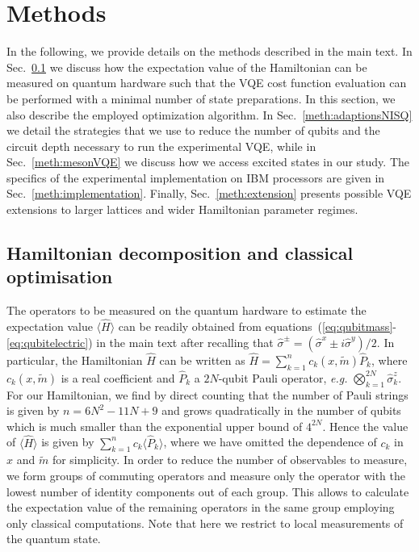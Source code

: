 \documentclass[twocolumn,aps,showpacs,prb,superscriptaddress,floatfix,10pt,nofootinbib]{revtex4-2}
\begin{document}
\section*{Methods}
In the following, we provide details on the methods described in the main text. In Sec.~\ref{meth:classicalPart} we discuss how the expectation value of the Hamiltonian can be measured on quantum hardware such that the VQE cost function evaluation can be performed with a minimal number of state preparations. In this section, we also describe the employed optimization algorithm. In Sec.~\ref{meth:adaptionsNISQ} we detail the strategies that we use to reduce the number of qubits and the circuit depth necessary to run the experimental VQE, while in Sec.~\ref{meth:mesonVQE} we discuss how we access excited states in our study. The specifics of the experimental implementation on IBM processors are given in Sec.~\ref{meth:implementation}. Finally, Sec.~\ref{meth:extension} presents possible VQE extensions to larger lattices and wider Hamiltonian parameter regimes.



\subsection{Hamiltonian decomposition and classical optimisation}
\label{meth:classicalPart}
The operators to be measured on the quantum hardware to estimate the expectation value $\langle \hat{H} \rangle$ can be readily obtained from equations~(\ref{eq:qubitmass}-\ref{eq:qubitelectric}) in the main text after recalling that $\hat{\sigma}^\pm = (\hat{\sigma}^x \pm i\hat{\sigma}^y)/2$. In particular, the Hamiltonian $\hat{H}$ can be written as $\hat{H}=\sum_{k=1}^n c_k(x,\tilde{m}) \hat{P}_k$, where $c_k(x,\tilde{m})$ is a real coefficient and $\hat{P}_k$ a $2N$-qubit Pauli operator, \textit{e.g.} $\bigotimes_{k=1}^{2N}\hat{\sigma}^z_k$. For our Hamiltonian, we find by direct counting that the number of Pauli strings is given by $n=6N^2-11N+9$ and grows quadratically in the number of qubits which is much smaller than the exponential upper bound of $4^{2N}$.
Hence the value of $\langle \hat{H} \rangle$ is given by $\sum_{k=1}^n c_k \langle \hat{P}_k \rangle$, where we have omitted the dependence of $c_{k}$ in $x$ and $\tilde{m}$ for simplicity. In order to reduce the number of observables to measure, we form groups of commuting operators and measure only the operator with the lowest number of identity components out of each group. This allows to calculate the expectation value of the remaining operators in the same group employing only classical computations. Note that here we restrict to local measurements of the quantum state.
\end{document}
